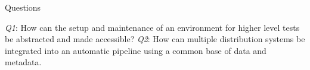 Questions

\textit{Q1}: How can the setup and maintenance of an environment for higher level tests be abstracted and made accessible?
\textit{Q2}: How can multiple distribution systems be integrated into an automatic pipeline using a common base of data and metadata.